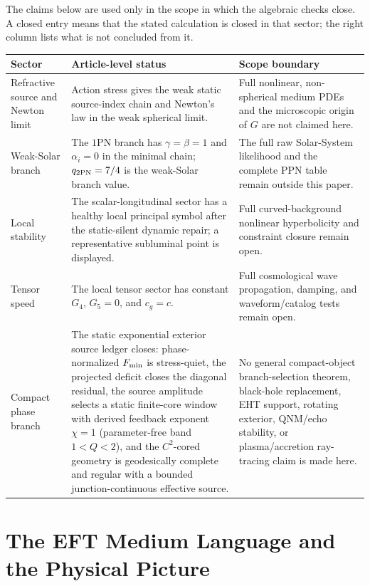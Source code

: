 \documentclass[12pt,a4paper]{article}
\begin{document}
The claims below are used only in the scope in which the algebraic checks close.
A closed entry means that the stated calculation is closed in that sector; the
right column lists what is not concluded from it.
\begin{center}
\small
\renewcommand{\arraystretch}{1.18}
\begin{tabular}{L{0.22\textwidth}L{0.35\textwidth}L{0.33\textwidth}}
\hline
Sector & Article-level status & Scope boundary \\
\hline
Refractive source and Newton limit &
Action stress gives the weak static source-index chain and Newton's law in the
weak spherical limit. &
Full nonlinear, non-spherical medium PDEs and the microscopic origin of $G$ are
not claimed here. \\
Weak-Solar branch &
The $1$PN branch has $\gamma=\beta=1$ and $\alpha_i=0$ in the minimal chain;
$q_{2{\rm PN}}=7/4$ is the weak-Solar branch value. &
The full raw Solar-System likelihood and the complete PPN table remain outside
this paper. \\
Local stability &
The scalar-longitudinal sector has a healthy local principal symbol after the
static-silent dynamic repair; a representative subluminal point is displayed. &
Full curved-background nonlinear hyperbolicity and constraint closure remain
open. \\
Tensor speed &
The local tensor sector has constant $G_4$, $G_5=0$, and $c_g=c$. &
Full cosmological wave propagation, damping, and waveform/catalog tests remain
open. \\
Compact phase branch &
The static exponential exterior source ledger closes: phase-normalized
$F_{\rm min}$ is stress-quiet, the projected deficit closes the diagonal
residual, the source amplitude selects a static finite-core window with
derived feedback exponent $\chi=1$ (parameter-free band $1<Q<2$), and the
$C^2$-cored geometry is geodesically complete and regular with a bounded
junction-continuous effective source. &
No general compact-object branch-selection theorem, black-hole replacement,
EHT support, rotating exterior, QNM/echo stability, or plasma/accretion
ray-tracing claim is made here. \\
\hline
\end{tabular}
\end{center}

\section{The EFT Medium Language and the Physical Picture}
\end{document}
